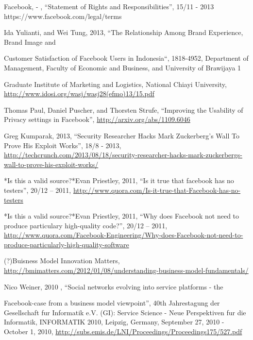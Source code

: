 \documentclass[conference]{IEEEtran}
\begin{document}
\begin{thebibliography}{1}
Facebook, - , “Statement of Rights and Responsibilities”, 15/11 - 2013
https://www.facebook.com/legal/terms

Ida Yulianti, and Wei Tung, 2013, “The Relationship Among Brand Experience,
Brand Image and

Customer Satisfaction of Facebook Users in Indonesia“, 1818-4952, Department of
Management, Faculty of Economic and Business, and University of Brawijaya 1

Graduate Institute of Marketing and Logistics, National Chiayi University,
\href{http://www.idosi.org/wasj/wasj28(efmo)13/15.pdf}{http://www.idosi.org/wasj/wasj28(efmo)13/15.pdf }

Thomas Paul, Daniel Puscher, and Thorsten Strufe, “Improving the Usability of
Privacy settings in Facebook”, \href{http://arxiv.org/abs/1109.6046}{http://arxiv.org/abs/1109.6046 }

Greg Kumparak, 2013, “Security Researcher Hacks Mark Zuckerberg’s Wall To Prove
His Exploit Works”, 18/8 - 2013,
\href{http://techcrunch.com/2013/08/18/security-researcher-hacks-mark-zuckerbergs-wall-to-prove-his-exploit-works/}{http://techcrunch.com/2013/08/18/security-researcher-hacks-mark-zuckerbergs-wall-to-prove-his-exploit-works/}

*Is this a valid source?*Evan Priestley, 2011, “Is it true that facebook has no
testers”, 20/12 – 2011,
\href{http://www.quora.com/Is-it-true-that-Facebook-has-no-testers}{http://www.quora.com/Is-it-true-that-Facebook-has-no-testers}

*Is this a valid source?*Evan Priestley, 2011, “Why does Facebook not need to
produce particulary high-quality code?”, 20/12 – 2011,
\href{http://www.quora.com/Facebook-Engineering/Why-does-Facebook-not-need-to-produce-particularly-high-quality-software}{http://www.quora.com/Facebook-Engineering/Why-does-Facebook-not-need-to-produce-particularly-high-quality-software}

(?)Buisness Model Innovation Matters,
\href{http://bmimatters.com/2012/01/08/understanding-business-model-fundamentals/}{http://bmimatters.com/2012/01/08/understanding-business-model-fundamentals/}

Nico Weiner, 2010 , “Social networks evolving into service platforms - the

Facebook-case from a business model viewpoint”, 40th Jahrestagung der
Gesellschaft fur Informatik e.V. (GI): Service Science - Neue Perspektiven fur
die Informatik, INFORMATIK 2010, Leipzig, Germany, September 27, 2010 - October
1, 2010, \href{http://subs.emis.de/LNI/Proceedings/Proceedings175/527.pdf}{http://subs.emis.de/LNI/Proceedings/Proceedings175/527.pdf}


\end{thebibliography}
\end{document}
